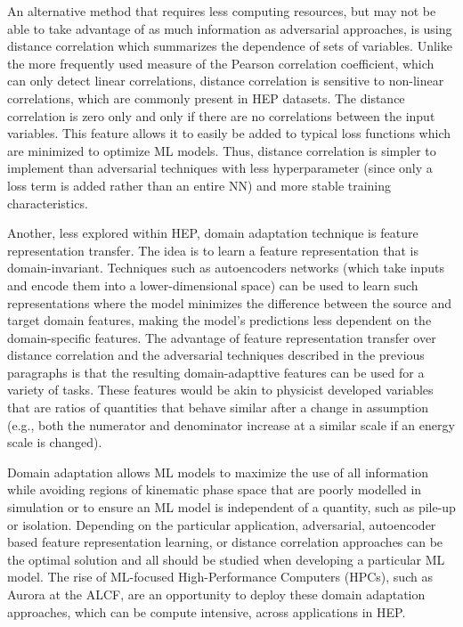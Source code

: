 \documentclass[letter, USenglish, 11pt, subfigure]{article}
\begin{document}
An alternative method that requires less computing resources, but may not be able to take advantage of as much information as adversarial approaches, is using distance correlation which summarizes the dependence of sets of variables. Unlike the more frequently used measure of the Pearson correlation coefficient, which can only detect linear correlations, distance correlation is sensitive to non-linear correlations, which are commonly present in HEP datasets. The distance correlation is zero only and only if there are no correlations between the input variables. This feature allows it to easily be added to typical loss functions which are minimized to optimize ML models. Thus, distance correlation is simpler to implement than adversarial techniques with less hyperparameter (since only a loss term is added rather than an entire NN) and more stable training characteristics. 

Another, less explored within HEP, domain adaptation technique is feature representation transfer. The idea is to learn a feature representation that is domain-invariant. Techniques such as autoencoders networks (which take inputs and encode them into a lower-dimensional space) can be used to learn such representations where the model minimizes the difference between the source and target domain features, making the model's predictions less dependent on the domain-specific features. The advantage of feature representation transfer over distance correlation and the adversarial techniques described in the previous paragraphs is that the resulting domain-adapttive features can be used for a variety of tasks. These features would be akin to physicist developed variables that are ratios of quantities that behave similar after a change in assumption (e.g., both the numerator and denominator increase at a similar scale if an energy scale is changed).

Domain adaptation allows ML models to maximize the use of all information while avoiding regions of kinematic phase space that are poorly modelled in simulation or to ensure an ML model is independent of a quantity, such as pile-up or isolation. Depending on the particular application, adversarial, autoencoder based feature representation learning, or distance correlation approaches can be the optimal solution and all should be studied when developing a particular ML model. The rise of ML-focused High-Performance Computers (HPCs), such as Aurora at the ALCF, are an opportunity to deploy these domain adaptation approaches, which can be compute intensive, across applications in HEP.
\end{document}
